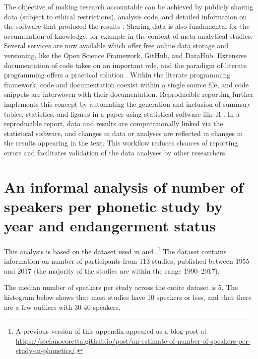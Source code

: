\documentclass[12pt,a4paper,]{article}
\begin{document}
The objective of making research accountable can be achieved by publicly
sharing data (subject to ethical restrictions), analysis code, and
detailed information on the software that produced the results
\citep{sandve2013}. Sharing data is also fundamental for the
accumulation of knowledge, for example in the context of meta-analytical
studies. Several services are now available which offer free online data
storage and versioning, like the Open Science Framework, GitHub, and
DataHub. Extensive documentation of code takes on an important role, and
the paradigm of literate programming offers a practical solution
\citep{knuth1984}. Within the literate programming framework, code and
documentation coexist within a single source file, and code snippets are
interwoven with their documentation. Reproducible reporting further
implements this concept \citep{peng2015} by automating the generation
and inclusion of summary tables, statistics, and figures in a paper
using statistical software like R \citep{r-core-team2019}. In a
reproducible report, data and results are computationally linked via the
statistical software, and changes in data or analyses are reflected in
changes in the results appearing in the text. This workflow reduces
chances of reporting errors and facilitates validation of the data
analyses by other researchers.

\appendix

\hypertarget{an-informal-analysis-of-number-of-speakers-per-phonetic-study-by-year-and-endangerment-status}{%
\section{An informal analysis of number of speakers per phonetic study
by year and endangerment
status}\label{an-informal-analysis-of-number-of-speakers-per-phonetic-study-by-year-and-endangerment-status}}

\label{a:speakers}

This analysis is based on the dataset used in \citet{roettger2017} and
\citet{gordon2017}
\citep{gordon2018}.\footnote{A previous version of this appendix appeared as a blog post at \url{https://stefanocoretta.github.io/post/an-estimate-of-number-of-speakers-per-study-in-phonetics/}.}
The dataset contains information on number of participants from 113
studies, published between 1955 and 2017 (the majority of the studies
are within the range 1990--2017).

The median number of speakers per study across the entire dataset is 5.
The histogram below shows that most studies have 10 speakers or less,
and that there are a few outliers with 30-40 speakers.
\end{document}
